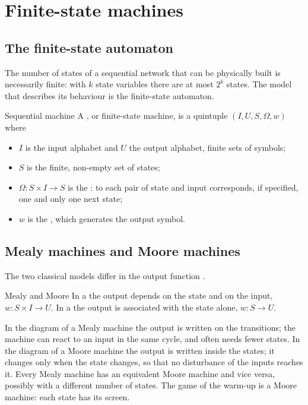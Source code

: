 \section{Finite-state machines}

\subsection{The finite-state automaton}

The number of states of a sequential network that can be physically built is
necessarily finite: with $k$ state variables there are at most $2^{k}$ states.
The model that describes its behaviour is the finite-state automaton.

\begin{definition}{Sequential machine}
A , or finite-state machine, is a quintuple
$(I,U,S,\Omega,w)$ where
\begin{itemize}[nosep]
\item $I$ is the input alphabet and $U$ the output alphabet, finite sets of
  symbols;
\item $S$ is the finite, non-empty set of states;
\item $\Omega: S\times I\to S$ is the : to each pair
  of state and input corresponds, if specified, one and only one next state;
\item $w$ is the , which generates the output symbol.
\end{itemize}
\end{definition}

\subsection{Mealy machines and Moore machines}

The two classical models differ in the output function
\citep{mealy1955,moore1956}.

\begin{definition}{Mealy and Moore}
In a  the output depends on the state and on the input,
$w:S\times I\to U$. In a  the output is associated with
the state alone, $w:S\to U$.
\end{definition}

In the diagram of a Mealy machine the output is written on the transitions;
the machine can react to an input in the same cycle, and often needs fewer
states. In the diagram of a Moore machine the output is written inside the
states; it changes only when the state changes, so that no disturbance of the
inputs reaches it. Every Mealy machine has an equivalent Moore machine and
vice versa, possibly with a different number of states. The game of the
warm-up is a Moore machine: each state has its screen.


